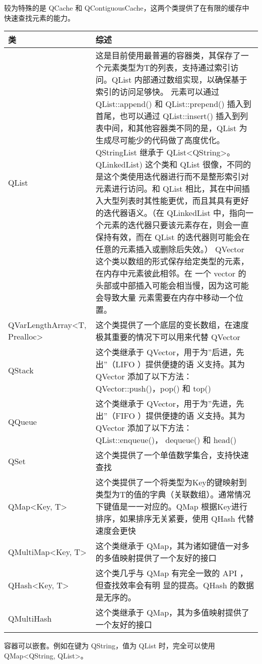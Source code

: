较为特殊的是 QCache 和 QContiguousCache，这两个类提供了在有限的缓存中
快速查找元素的能力。


\begin{tabular}{|l|l|}
\hline
类&综述 \\
\hline
QList&	这是目前使用最普遍的容器类，其保存了一个元素类型为T的列表，支持通过索引访问。QList 内部通过数组实现，以确保基于索引的访问足够快。
元素可以通过 QList::append() 和 QList::prepend() 插入到首尾，也可以通过 QList::insert() 插入到列表中间，和其他容器类不同的是，QList 为生成尽可能少的代码做了高度优化。QStringList 继承于 QList<QString>。
QLinkedList)	这个类和 QList 很像，不同的是这个类使用迭代器进行而不是整形索引对元素进行访问。和 QList 相比，其在中间插入大型列表时其性能更优，而且其具有更好的迭代器语义。（在 QLinkedList 中，指向一个元素的迭代器只要该元素存在，则会一直保持有效，而在 QList 的迭代器则可能会在任意的元素插入或删除后失效。）
QVector	这个类以数组的形式保存给定类型的元素，在内存中元素彼此相邻。在
       一个 vector 的头部或中部插入可能会相当慢，因为这可能会导致大量
       元素需要在内存中移动一个位置。\\
\hline
QVarLengthArray<T, Prealloc>&	这个类提供了一个底层的变长数组，在速度极其重要的情况下可以用来代替 QVector\\
QStack&	这个类继承于 QVector，用于为”后进，先出”（LIFO ）提供便捷的语
        义支持。其为 QVector 添加了以下方法：QVector::push()，pop() 和
        top()\\
\hline
QQueue&	这个类继承于 QVector，用于为”先进，先出”（FIFO ）提供便捷的语
        义支持。其为 QVector 添加了以下方法：QList::enqueue()，
        dequeue() 和 head()\\
\hline
QSet&	这个类提供了一个单值数学集合，支持快速查找\\
\hline
QMap<Key, T>&	这个类提供了一个将类型为Key的键映射到类型为T的值的字典（关联数组）。通常情况下键值是一一对应的。QMap 根据Key进行排序，如果排序无关紧要，使用 QHash 代替速度会更快\\
\hline
QMultiMap<Key, T>&	这个类继承于 QMap，其为诸如键值一对多的多值映射提供了一个友好的接口\\
\hline
QHash<Key, T>&	这个类几乎与 QMap 有完全一致的 API ，但查找效率会有明
               显的提高。QHash 的数据是无序的。\\
\hline
QMultiHash&	这个类继承于 QMap，其为多值映射提供了一个友好的接口\\
\hline
\end{tabular}

容器可以嵌套。例如在键为 QString，值为 QList 时，完全可以使用 QMap<QString, QList>。


